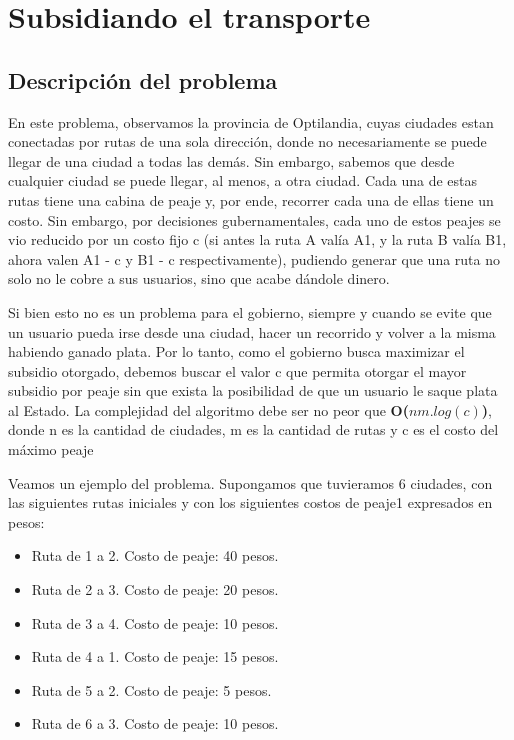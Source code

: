 \section{Subsidiando el transporte}

\subsection{Descripción del problema}
En este problema, observamos la provincia de Optilandia, cuyas ciudades estan conectadas por rutas de una sola dirección, donde no necesariamente se puede llegar de una ciudad a todas las demás. Sin embargo, sabemos que desde cualquier ciudad se puede llegar, al menos, a otra ciudad. Cada una de estas rutas tiene una cabina de peaje y, por ende, recorrer cada una de ellas tiene un costo. Sin embargo, por decisiones gubernamentales, cada uno de estos peajes se vio reducido por un costo fijo c (si antes la ruta A valía A1, y la ruta B valía B1, ahora valen A1 - c y B1 - c respectivamente), pudiendo generar que una ruta no solo no le cobre a sus usuarios, sino que acabe dándole dinero.
\\
\par
Si bien esto no es un problema para el gobierno, siempre y cuando se evite que un usuario pueda irse desde una ciudad, hacer un recorrido y volver a la misma habiendo ganado plata. Por lo tanto, como el gobierno busca maximizar el subsidio otorgado, debemos buscar el valor c que permita otorgar el mayor subsidio por peaje sin que exista la posibilidad de que un usuario le saque plata al Estado. La complejidad del algoritmo debe ser no peor que \textbf{O($nm.log(c)$)}, donde n es la cantidad de ciudades, m es la cantidad de rutas y c es el costo del máximo peaje
\\
\par
Veamos un ejemplo del problema. Supongamos que tuvieramos 6 ciudades, con las siguientes rutas iniciales y con los siguientes costos de peaje1 expresados en pesos:
\begin{itemize}
\item Ruta de 1 a 2. Costo de peaje: 40 pesos.
\item Ruta de 2 a 3. Costo de peaje: 20 pesos.
\item Ruta de 3 a 4. Costo de peaje: 10 pesos.
\item Ruta de 4 a 1. Costo de peaje: 15 pesos.
\item Ruta de 5 a 2. Costo de peaje: 5 pesos.
\item Ruta de 6 a 3. Costo de peaje: 10 pesos.
\end{itemize}

